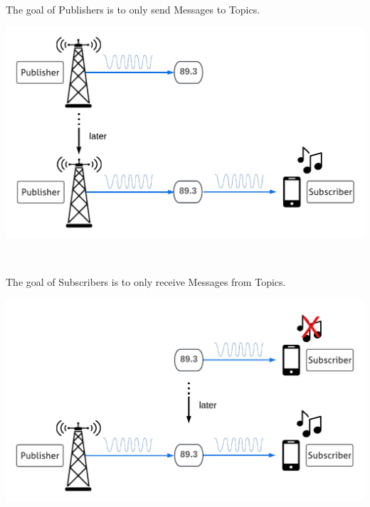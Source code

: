\documentclass[usenames,11,dvipsnames,svgnames,x11names,aspectratio=1610,bibref]{beamer}
\newcommand{\mydisclaimer}{{\color{disclaimer}{\scriptsize ROS 2 -- Part I}}}
\renewcommand\sec{{\cnordSix{\secname}\hfill\mydisclaimer~} }
\begin{document}
\begin{frame}[fragile]{\sec}
\vspace*{\fill}
\begin{center} 
The goal of Publishers is to only send Messages to Topics.

\includegraphics[width=.7\linewidth]{figures/lecture2/analogy4.pdf}

\end{center}
\vspace*{\fill}
\end{frame}


\begin{frame}[fragile]{\sec}
\vspace*{\fill}
\begin{center} 
The goal of Subscribers is to only receive Messages from Topics.

\includegraphics[width=.7\linewidth]{figures/lecture2/analogy5.pdf}

\end{center}
\vspace*{\fill}
\end{frame}
\end{document}
